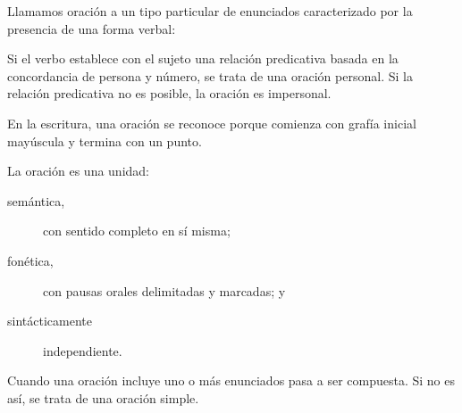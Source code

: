Llamamos oración a un tipo particular de enunciados caracterizado
por la presencia de una forma verbal:

Si el verbo establece con el sujeto una relación predicativa basada
en la concordancia de persona y número, se trata de una oración personal.
Si la relación predicativa no es posible, la oración es impersonal. 

En la escritura, una oración se reconoce porque comienza con grafía
inicial mayúscula y termina con un punto.

La oración es una unidad:
\begin{description}
\item [{semántica,}] con sentido completo en sí misma; 
\item [{fonética,}] con pausas orales delimitadas y marcadas; y
\item [{sintácticamente}] independiente. 
\end{description}
Cuando una oración incluye uno o más enunciados pasa a ser compuesta.
Si no es así, se trata de una oración simple.

